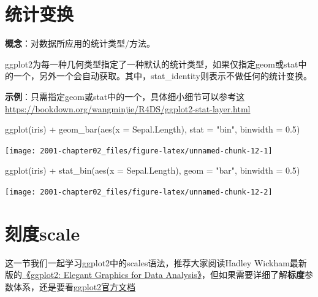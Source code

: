 \documentclass[
]{book}
\newenvironment{Shaded}{\begin{snugshade}}{\end{snugshade}}
\newcommand{\AttributeTok}[1]{\textcolor[rgb]{0.77,0.63,0.00}{#1}}
\newcommand{\FloatTok}[1]{\textcolor[rgb]{0.00,0.00,0.81}{#1}}
\newcommand{\FunctionTok}[1]{\textcolor[rgb]{0.00,0.00,0.00}{#1}}
\newcommand{\NormalTok}[1]{#1}
\newcommand{\SpecialCharTok}[1]{\textcolor[rgb]{0.00,0.00,0.00}{#1}}
\newcommand{\StringTok}[1]{\textcolor[rgb]{0.31,0.60,0.02}{#1}}
\begin{document}
\hypertarget{ux7edfux8ba1ux53d8ux6362}{%
\section{统计变换}\label{ux7edfux8ba1ux53d8ux6362}}

\textbf{概念}：对数据所应用的统计类型/方法。

ggplot2为每一种几何类型指定了一种默认的统计类型，如果仅指定geom或stat中的一个，另外一个会自动获取。其中，stat\_identity则表示不做任何的统计变换。

\textbf{示例}：只需指定geom或stat中的一个，具体细小细节可以参考这
\url{https://bookdown.org/wangminjie/R4DS/ggplot2-stat-layer.html}

\begin{Shaded}
\begin{Highlighting}[]
\FunctionTok{ggplot}\NormalTok{(iris) }\SpecialCharTok{+} \FunctionTok{geom\_bar}\NormalTok{(}\FunctionTok{aes}\NormalTok{(}\AttributeTok{x =}\NormalTok{ Sepal.Length), }\AttributeTok{stat =} \StringTok{"bin"}\NormalTok{, }\AttributeTok{binwidth =} \FloatTok{0.5}\NormalTok{)}
\end{Highlighting}
\end{Shaded}

\begin{center}\texttt{[image: 2001-chapter02\_files/figure-latex/unnamed-chunk-12-1]} \end{center}

\begin{Shaded}
\begin{Highlighting}[]
\FunctionTok{ggplot}\NormalTok{(iris) }\SpecialCharTok{+} \FunctionTok{stat\_bin}\NormalTok{(}\FunctionTok{aes}\NormalTok{(}\AttributeTok{x =}\NormalTok{ Sepal.Length), }\AttributeTok{geom =} \StringTok{"bar"}\NormalTok{, }\AttributeTok{binwidth =} \FloatTok{0.5}\NormalTok{)}
\end{Highlighting}
\end{Shaded}

\begin{center}\texttt{[image: 2001-chapter02\_files/figure-latex/unnamed-chunk-12-2]} \end{center}

\hypertarget{ux523bux5ea6scale}{%
\section{刻度scale}\label{ux523bux5ea6scale}}

这一节我们一起学习ggplot2中的scales语法，推荐大家阅读Hadley
Wickham最新版的\href{https://ggplot2-book.org/}{《ggplot2: Elegant Graphics for Data
Analysis》}，但如果需要详细了解\textbf{标度}参数体系，还是要看\href{https://cran.r-project.org/web/packages/ggplot2/index.html}{ggplot2官方文档}
\end{document}
